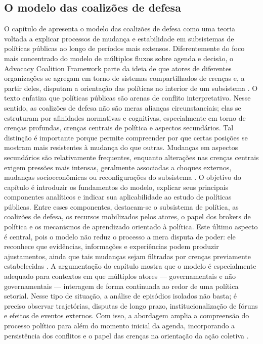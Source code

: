 \documentclass[12pt,a4paper]{article}
\begin{document}
\subsection{O modelo das coalizões de defesa}
\label{sec:org4fcacdb}
O capítulo de \textcite{araujoSilva2022coalizoes} apresenta o modelo das coalizões de defesa como uma teoria voltada a explicar processos de mudança e estabilidade em subsistemas de políticas públicas ao longo de períodos mais extensos. Diferentemente do foco mais concentrado do modelo de múltiplos fluxos sobre agenda e decisão, o Advocacy Coalition Framework parte da ideia de que atores de diferentes organizações se agregam em torno de sistemas compartilhados de crenças e, a partir deles, disputam a orientação das políticas no interior de um subsistema \autocites{araujoSilva2022coalizoes}{sabatier1999theories}.
O texto enfatiza que políticas públicas são arenas de conflito interpretativo. Nesse sentido, as coalizões de defesa não são meras alianças circunstanciais; elas se estruturam por afinidades normativas e cognitivas, especialmente em torno de crenças profundas, crenças centrais de política e aspectos secundários. Tal distinção é importante porque permite compreender por que certas posições se mostram mais resistentes à mudança do que outras. Mudanças em aspectos secundários são relativamente frequentes, enquanto alterações nas crenças centrais exigem pressões mais intensas, geralmente associadas a choques externos, mudanças socioeconômicas ou reconfigurações do subsistema \autocite{araujoSilva2022coalizoes}.
O objetivo do capítulo é introduzir os fundamentos do modelo, explicar seus principais componentes analíticos e indicar sua aplicabilidade ao estudo de políticas públicas. Entre esses componentes, destacam-se o subsistema de política, as coalizões de defesa, os recursos mobilizados pelos atores, o papel dos brokers de política e os mecanismos de aprendizado orientado à política. Este último aspecto é central, pois o modelo não reduz o processo a mera disputa de poder: ele reconhece que evidências, informações e experiências podem produzir ajustamentos, ainda que tais mudanças sejam filtradas por crenças previamente estabelecidas \autocite{araujoSilva2022coalizoes}.
A argumentação do capítulo mostra que o modelo é especialmente adequado para contextos em que múltiplos atores — governamentais e não governamentais — interagem de forma continuada ao redor de uma política setorial. Nesse tipo de situação, a análise de episódios isolados não basta; é preciso observar trajetórias, disputas de longo prazo, institucionalização de fóruns e efeitos de eventos externos. Com isso, a abordagem amplia a compreensão do processo político para além do momento inicial da agenda, incorporando a persistência dos conflitos e o papel das crenças na orientação da ação coletiva \autocite{araujoSilva2022coalizoes}.
\end{document}
